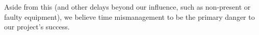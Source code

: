 \documentclass[a4paper,10pt]{article}
\begin{document}
\begin{description}[align=left]
        Aside  from this  (and  other  delays beyond  our  influence, such  as
        non-present or faulty equipment), we  believe time mismanagement to be
        the primary danger to our project's success.
\end{description}
\end{document}
